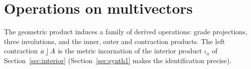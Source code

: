 \section{Operations on multivectors}\label{sec:ops}

The geometric product induces a family of derived operations: grade projections, three involutions, and the inner, outer and
contraction products. The left contraction $a\mathbin{\rfloor} A$ is the metric incarnation of the interior product $\iota_a$ of
Section~\ref{sec:interior} (Section~\ref{sec:synth1} makes the identification precise).


